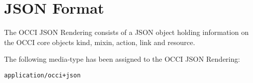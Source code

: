 \documentclass[10pt,a4paper]{article}
\begin{document}
%
%
%
%
%
%

\section{JSON Format}
\label{sec:json_format}
The OCCI JSON Rendering consists of a JSON object holding information on the 
OCCI core objects kind, mixin, action, link and resource.

The following media-type has been assigned to the OCCI JSON Rendering:

{\tt application/occi+json}


%
%
%
\end{document}
